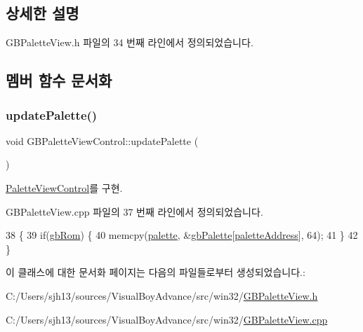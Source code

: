 \subsection{상세한 설명}


G\+B\+Palette\+View.\+h 파일의 34 번째 라인에서 정의되었습니다.



\subsection{멤버 함수 문서화}
\mbox{\label{class_g_b_palette_view_control_a0fb70c16ea8f4731e7159df59beb3c6e}} 
\subsubsection{\texorpdfstring{update\+Palette()}{updatePalette()}}
{\footnotesize\ttfamily void G\+B\+Palette\+View\+Control\+::update\+Palette (\begin{DoxyParamCaption}{ }\end{DoxyParamCaption})\hspace{0.3cm}{\ttfamily [virtual]}}



\mbox{\hyperlink{class_palette_view_control_a12772d59f8e890a920cb200d2f6a4b7a}{Palette\+View\+Control}}를 구현.



G\+B\+Palette\+View.\+cpp 파일의 37 번째 라인에서 정의되었습니다.


\begin{DoxyCode}
38 \{
39   \textcolor{keywordflow}{if}(\mbox{\hyperlink{gb_globals_8cpp_ae4f6bd8162474dbcfdbc54c36d7f5695}{gbRom}}) \{
40     memcpy(\mbox{\hyperlink{class_palette_view_control_a1a5ce1812cf6c8d26889f4eb03d1d4ec}{palette}}, &\mbox{\hyperlink{gb_globals_8cpp_a7c46bfb4d71e64d27d5aec543ba85b9a}{gbPalette}}[\mbox{\hyperlink{class_palette_view_control_a53b2efd4174e06a68e545608e458947b}{paletteAddress}}], 64);
41   \}
42 \}
\end{DoxyCode}


이 클래스에 대한 문서화 페이지는 다음의 파일들로부터 생성되었습니다.\+:\begin{DoxyCompactItemize}
\item 
C\+:/\+Users/sjh13/sources/\+Visual\+Boy\+Advance/src/win32/\mbox{\hyperlink{_g_b_palette_view_8h}{G\+B\+Palette\+View.\+h}}\item 
C\+:/\+Users/sjh13/sources/\+Visual\+Boy\+Advance/src/win32/\mbox{\hyperlink{_g_b_palette_view_8cpp}{G\+B\+Palette\+View.\+cpp}}\end{DoxyCompactItemize}
